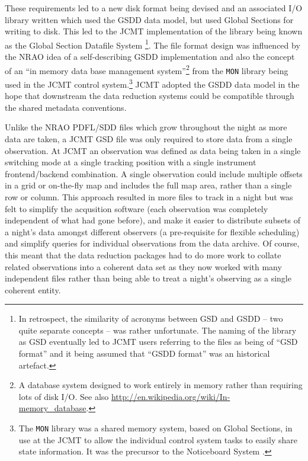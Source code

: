 \documentclass[final,authoryear,5p,times,twocolumn]{elsarticle}
\begin{document}
These requirements led to a new disk format being devised and an associated
I/O library written which used the GSDD data model, but used Global Sections
for writing to disk. This led to the JCMT implementation of the library being
known as the Global Section Datafile System
\citep[GSD;][]{mtin33}\footnote{In retrospect, the similarity of
  acronyms between GSD and GSDD -- two quite separate concepts -- was
  rather unfortunate. The naming of the library as GSD eventually led
  to JCMT users referring to the files as being of ``GSD format'' and
  it being assumed that ``GSDD format'' was an historical artefact.}.
The file format
design was influenced by the NRAO idea of a self-describing GSDD
implementation and also the concept of an ``in memory data base
management system''\footnote{A database system designed to work
  entirely in memory rather than requiring lots of disk I/O. See also
  \url{http://en.wikipedia.org/wiki/In-memory_database}.} from the
\texttt{MON} library being used in the JCMT control
system.\footnote{The \texttt{MON} library was a shared memory system,
  based on Global Sections, in use at the JCMT to allow the individual
  control system tasks to easily share state information. It was the
  precursor to the Noticeboard System \citep[NBS;][]{SUN77}.}  JCMT
adopted the GSDD data model in the hope that downstream the data
reduction systems could be compatible through the shared metadata
conventions.

Unlike the NRAO PDFL/SDD files which grow throughout the night as more
data are taken, a JCMT GSD file was only required to store data from a
single observation. At JCMT an observation was defined as data being
taken in a single switching mode at a single tracking position with a
single instrument frontend/backend combination. A single observation
could include multiple offsets in a grid or on-the-fly map and
includes the full map area, rather than a single row or column. This
approach resulted in more files to track in a night but was felt to
simplify the acqusition software (each observation was completely
independent of what had gone before), and make it easier to distribute
subsets of a night's data amongst different observers (a pre-requisite
for flexible scheduling) and simplify queries for individual
observations from the data archive. Of course, this meant that the
data reduction packages had to do more work to collate related
observations into a coherent data set as they now worked with many
independent files rather than being able to treat a night's observing
as a single coherent entity.
\end{document}
